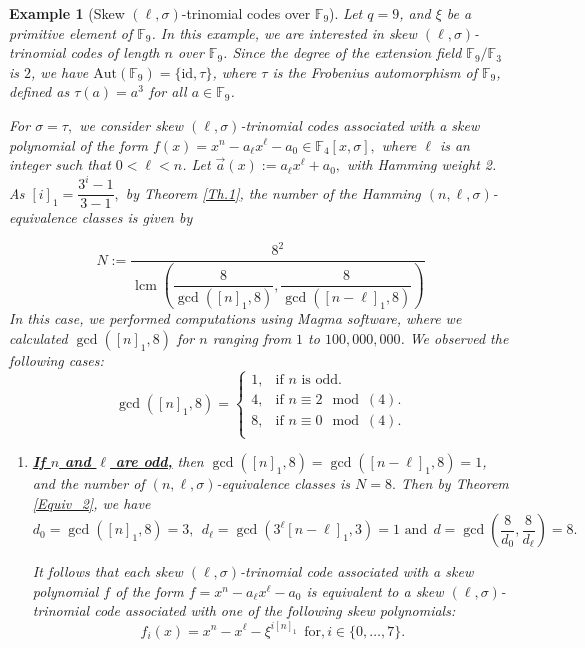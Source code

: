 \documentclass[12pt,paper]{article}
\theoremstyle{plain}
\newtheorem{example}[theorem]{Example}
\DeclareMathOperator{\lcm}{lcm}
\begin{document}
 \begin{example} [Skew $(\ell,\sigma)$-trinomial  codes  over $\mathbb{F}_9$]
Let $q = 9$, and $\xi$ be a primitive element of $\mathbb{F}_9$. In this example, we are interested in skew $(\ell,\sigma)$-trinomial   codes of length $n$ over $\mathbb{F}_9$. Since the degree of the extension field $\mathbb{F}_9/\mathbb{F}_3$ is $2$, we have $\text{Aut}(\mathbb{F}_9) = \{\text{id}, \tau\}$, where $\tau$ is the Frobenius automorphism of $\mathbb{F}_9$, defined as $\tau(a) = a^3$ for all $a \in \mathbb{F}_9$. 

For $\sigma=\tau,$ we consider skew $(\ell,\sigma)$-trinomial  codes   associated with  a skew polynomial of the form $f(x) =x^{n}-a_{\ell}x^{\ell}-a_0\in \mathbb{F}_4[x,\sigma],$
 where $\ell $ is  an integer such that $0<\ell <n$.  Let $\vec{a}(x):=   a_{\ell}x^{\ell}+a_0 ,$  with Hamming weight 2.
 As $[i]_1= \dfrac{3^i-1}{3-1},$ by Theorem  \ref{Th.1}, the number of the Hamming $(n,\ell, \sigma)$-equivalence classes is given by  
 
 $$N:=\dfrac{8^2}{ \lcm\left(\dfrac{8}{\gcd( [n]_1 ,8 )}, \dfrac{8}{\gcd( [n-\ell]_1,8)}  \right)}    
 $$ 
  In this case, we performed computations  using Magma software, where we calculated $\operatorname{gcd}([n]_1, 8)$ for $n$ ranging from $1$ to $100,000,000$. We observed the following cases:
$$
\gcd([n]_1, 8) = \begin{cases}
 1 , & \text{if $n$ is odd.}\\
4, &  \text{if $n \equiv  2 \mod(4)$.}\\
8, &  \text{if $n \equiv  0 \mod(4)$.}\\
  \end{cases} 
$$ 

\begin{enumerate}
    \item  \underline{\textbf{If $n$ and $\ell$ are odd,}} then $\gcd \left( [n]_1 , 8\right) =\gcd \left( [n-\ell]_1 , 8\right)= 1$, and the number of $(n,\ell,\sigma)$-equivalence classes is $ N= 8.$  Then by Theorem \ref{Equiv_2}, we have 
     $$d_0=\gcd( [n]_1, 8)= 3,\ \ d_{\ell}= \gcd( 3^{\ell}[n-\ell]_1, 3)= 1 \text{ and} \ \  d=\gcd\left( \frac{8}{d_0}, \frac{8}{d_{\ell}}\right)=8.$$

     It follows that each  skew $(\ell,\sigma)$-trinomial  code associated with a skew  polynomial $f$ of the form  $f =x^{n}- a_{\ell} x^{\ell}-a_0$ is equivalent to a  skew $(\ell,\sigma)$-trinomial  code  associated with one of the following  skew polynomials: 
  $$f_{i}(x)= x^{n} - x^{\ell} - \xi^{ i [n]_1 }  \ \ \text{for}, i\in \{0,\ldots, 7\}.  $$


\end{enumerate}
\end{example}
\end{document}

